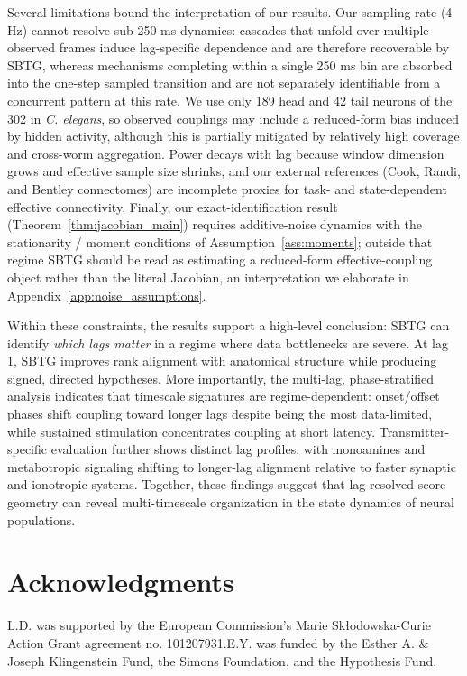 \documentclass{article}
\theoremstyle{plain}
\theoremstyle{definition}
\theoremstyle{remark}
\newcommand{\1}{\mathbf{1}}
\begin{document}
Several limitations bound the interpretation of our results. Our sampling rate (4 Hz) cannot resolve sub-250 ms dynamics: cascades that unfold over multiple observed frames induce lag-specific dependence and are therefore recoverable by SBTG, whereas mechanisms completing within a single 250 ms bin are absorbed into the one-step sampled transition and are not separately identifiable from a concurrent pattern at this rate. We use only 189 head and 42 tail neurons of the 302 in \textit{C. elegans}, so observed couplings may include a reduced-form bias induced by hidden activity, although this is partially mitigated by relatively high coverage and cross-worm aggregation. Power decays with lag because window dimension grows and effective sample size shrinks, and our external references (Cook, Randi, and Bentley connectomes) are incomplete proxies for task- and state-dependent effective connectivity. Finally, our exact-identification result (Theorem~\ref{thm:jacobian_main}) requires additive-noise dynamics with the stationarity / moment conditions of Assumption~\ref{ass:moments}; outside that regime SBTG should be read as estimating a reduced-form effective-coupling object rather than the literal Jacobian, an interpretation we elaborate in Appendix~\ref{app:noise_assumptions}.

Within these constraints, the results support a high-level conclusion: SBTG can identify \emph{which lags matter} in a regime where data bottlenecks are severe. At lag 1, SBTG improves rank alignment with anatomical structure while producing signed, directed hypotheses. More importantly, the multi-lag, phase-stratified analysis indicates that timescale signatures are regime-dependent: onset/offset phases shift coupling toward longer lags despite being the most data-limited, while sustained stimulation concentrates coupling at short latency. Transmitter-specific evaluation further shows distinct lag profiles, with monoamines and metabotropic signaling shifting to longer-lag alignment relative to faster synaptic and ionotropic systems. Together, these findings suggest that lag-resolved score geometry can reveal multi-timescale organization in the state dynamics of neural populations.

\section*{Acknowledgments}
L.D. was supported by the European Commission's Marie Skłodowska-Curie Action Grant agreement no. 101207931.E.Y. was funded by the Esther A. \& Joseph Klingenstein Fund, the Simons Foundation, and the Hypothesis Fund.
\end{document}
